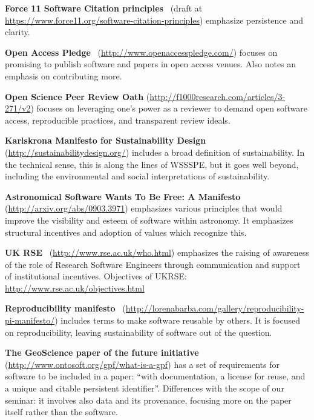\documentclass[a4paper,UKenglish]{dagman}
\newcommand{\manifesto}[1]{{\bf #1}\xspace}
\begin{document}
\begin{appendix}
\manifesto{Force 11 Software Citation principles}~\cite{arfon_m._smith_software_2016}
(draft at \url{https://www.force11.org/software-citation-principles})
emphasize persistence and clarity.

\manifesto{Open Access Pledge}~\cite{alex_holcombe_open_2011}
(\url{http://www.openaccesspledge.com/})
focuses on promising to publish software and papers in open access venues.
Also notes an emphasis on contributing more.

\manifesto{Open Science Peer Review Oath}
(\url{http://f1000research.com/articles/3-271/v2})
focuses on leveraging one's power as a reviewer to demand open software access, reproducible practices, and transparent review ideals.

\manifesto{Karlskrona Manifesto for Sustainability Design}~\cite{becker_karlskrona_2014}
(\url{http://sustainabilitydesign.org/})
includes a broad definition of sustainability. In the technical sense, this is along the lines of WSSSPE, but it goes well beyond, including the environmental and social interpretations of sustainability.

\manifesto{Astronomical Software Wants To Be Free: A Manifesto}~\cite{weiner_astronomical_2009}
(\url{http://arxiv.org/abs/0903.3971})
emphasizes various principles that would improve the visibility and esteem of software within astronomy. It emphasizes structural incentives and adoption of values which recognize this. 

\manifesto{UK RSE}~\cite{rse_conference_2016_what_2016}
(\url{http://www.rse.ac.uk/who.html})
emphasizes the raising of awareness of the role of Research Software Engineers through communication and support of institutional incentives.
Objectives of UKRSE: \url{http://www.rse.ac.uk/objectives.html}

\manifesto{Reproducibility manifesto}~\cite{barba_reproducibility_2012}
(\url{http://lorenabarba.com/gallery/reproducibility-pi-manifesto/})
includes terms to make software reusable by others. It is focused on reproducibility, leaving sustainability of software out of the question.

\manifesto{The GeoScience paper of the future initiative}~\cite{onto_soft_what_2016}
(\url{http://www.ontosoft.org/gpf/what-is-a-gpf})
has a set of requirements for software to be included in a paper: ``with documentation, a license for reuse, and a unique and citable persistent identifier''. Differences with the scope of our seminar: it involves also data and its provenance, focusing more on the paper itself rather than the software.


\end{appendix}
\end{document}

